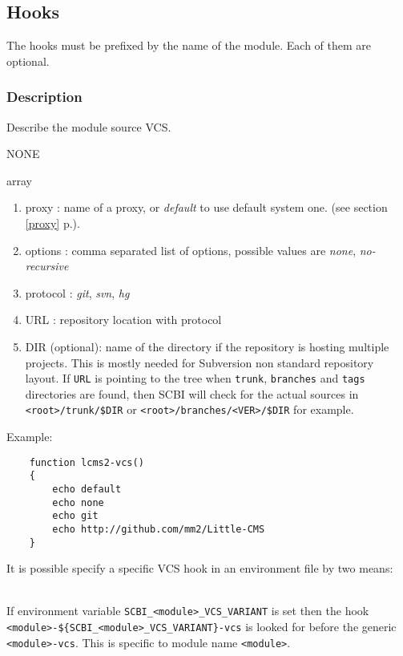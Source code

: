 \documentclass[a4paper,12pt,twoside]{article}
\newcommand{\code}[1]{\texttt{#1}}
\renewcommand{\emph}[1]{\textit{#1}}
\newcommand{\seeref}[1]{see section \ref{#1} p.\pageref{#1}}
\begin{document}
\subsection{Hooks}

The hooks must be prefixed by the name of the module. Each of them are optional.

\subsubsection{Description}

\begin{description}[font=\large\texttt]

	\item[<module>-vcs] Describe the module source VCS.
	\begin{description}[font=\textit,style=standard]
		\item[parameter] \tabto{2cm} NONE
		\item[return] \tabto{2cm} array
		\begin{enumerate}
			\item proxy : name of a proxy, or \emph{default} to use default system one. (\seeref{proxy}).
			\item options : comma separated list of options, possible values are \emph{none}, \emph{no-recursive}
			\item protocol : \emph{git}, \emph{svn}, \emph{hg}
			\item URL : repository location with protocol
			\item DIR (optional): name of the directory if the repository is hosting multiple projects. This is mostly needed for Subversion non standard repository layout. If \code{URL} is pointing to the tree when \code{trunk}, \code{branches} and \code{tags} directories are found, then SCBI will check for the actual sources in \code{<root>/trunk/\$DIR} or \code{<root>/branches/<VER>/\$DIR} for example.
		\end{enumerate}
	\end{description}

	Example:
	\begin{lstlisting}
	function lcms2-vcs()
	{
		echo default
		echo none
		echo git
		echo http://github.com/mm2/Little-CMS
	}
	\end{lstlisting}

	It is possible specify a specific VCS hook in an environment file by two means:

	\begin{description}[style=standard]
		\item[\code{SCBI\_<module>\_VCS\_VARIANT}] \hfill \\
		If environment variable \code{SCBI\_<module>\_VCS\_VARIANT} is set then the hook \\ \code{<module>-\$\{SCBI\_<module>\_VCS\_VARIANT\}-vcs} is looked for before the generic \code{<module>-vcs}. This is specific to module name \code{<module>}.


\end{description}
\end{description}
\end{document}
